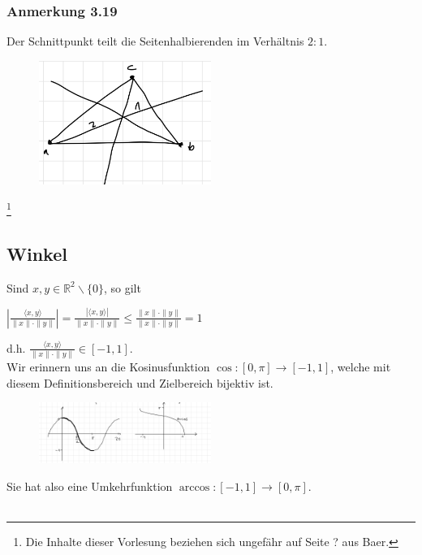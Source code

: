 \documentclass{article}
\begin{document}
\subsubsection*{Anmerkung 3.19}
Der Schnittpunkt teilt die Seitenhalbierenden im Verhältnis $2:1$. \\
\begin{figure}[h]
    \centering
    \includegraphics[width=0.5\textwidth]{Images/3.19.jpeg}
    \caption{}
\end{figure}

\newpage
\date{Mittwoch, 06.12.23} \footnote[1]{Die Inhalte dieser Vorlesung beziehen sich ungefähr auf Seite ? aus Baer.}
\subsection{Winkel}
Sind $x,y \in \mathbb{R}^2\backslash\{0\}$, so gilt \\
\begin{center}
    $\left| \frac{\langle x,y \rangle}{\|x\| \cdot \|y\|} \right| = \frac{|\langle x,y \rangle|}{\|x\| \cdot \|y\|} \leq \frac{\|x\| \cdot \|y\|}{\|x\| \cdot \|y\|} = 1$
\end{center}
d.h. $\frac{\langle x,y \rangle}{\|x\| \cdot \|y\|} \in [-1,1]$. \\
Wir erinnern uns an die Kosinusfunktion $\cos: [0,\pi] \rightarrow [-1,1]$, welche mit diesem Definitionsbereich und Zielbereich bijektiv ist. \\
\begin{figure}[h]
    \centering
    \includegraphics[width=0.5\textwidth]{Images/3.3.jpeg}
    \caption{}
\end{figure}
Sie hat also eine Umkehrfunktion $\arccos: [-1,1] \rightarrow [0,\pi]$. \\
\\
\end{document}
